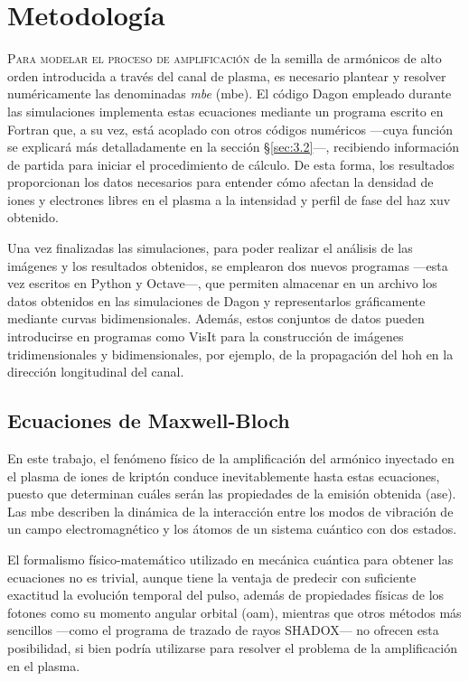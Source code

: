 \chapter{Metodología}\label{cap:3}
\lettrine{P}{ara modelar el proceso de amplificación} de la semilla de armónicos de alto orden introducida a través del canal de plasma, es necesario plantear y resolver numéricamente las denominadas \emph{\acrlong{mbe}} (\acrshort{mbe}). El código Dagon empleado durante las simulaciones implementa estas ecuaciones mediante un programa escrito en Fortran que, a su vez, está acoplado con otros códigos numéricos ---cuya función se explicará más detalladamente en la sección \S\ref{sec:3.2}---, recibiendo información de partida para iniciar el procedimiento de cálculo. De esta forma, los resultados proporcionan los datos necesarios para entender cómo afectan la densidad de iones y electrones libres en el plasma a la intensidad y perfil de fase del haz \acrshort{xuv} obtenido. 

Una vez finalizadas las simulaciones, para poder realizar el análisis de las imágenes y los resultados obtenidos, se emplearon dos nuevos programas ---esta vez escritos en Python y Octave---, que permiten almacenar en un archivo los datos obtenidos en las simulaciones de Dagon y representarlos gráficamente mediante curvas bidimensionales. Además, estos conjuntos de datos pueden introducirse en programas como VisIt para la construcción de imágenes tridimensionales y bidimensionales, por ejemplo, de la propagación del \acrshort{hoh} en la dirección longitudinal del canal.

\section{Ecuaciones de Maxwell-Bloch}\label{sec:3.1}
En este trabajo, el fenómeno físico de la amplificación del armónico inyectado en el plasma de iones de kriptón conduce inevitablemente hasta estas ecuaciones, puesto que determinan cuáles serán las propiedades de la emisión obtenida (\acrshort{ase}). Las \acrshort{mbe} describen la dinámica de la interacción entre los modos de vibración de un campo electromagnético y los átomos de un sistema cuántico con dos estados. 

El formalismo físico-matemático utilizado en mecánica cuántica para obtener las ecuaciones no es trivial\autocite{cohen-tannoudjiQuantumMechanicsVolume2019,cohen-tannoudjiQuantumMechanicsVolume2019a,Sakurai2020,milonniLasers1988}, aunque tiene la ventaja de predecir con suficiente exactitud la evolución temporal del pulso, además de propiedades físicas de los fotones como su momento angular orbital (\acrshort{oam}), mientras que otros métodos más sencillos ---como el programa de trazado de rayos SHADOX--- no ofrecen esta posibilidad, si bien podría utilizarse para resolver el problema de la amplificación en el plasma.

